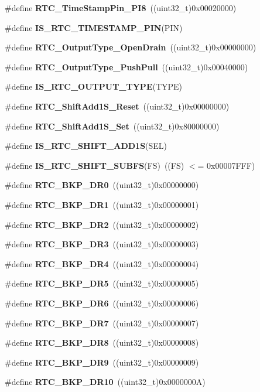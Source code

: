 \begin{DoxyCompactItemize}
\#define \textbf{ R\+T\+C\+\_\+\+Time\+Stamp\+Pin\+\_\+\+P\+I8}~((uint32\+\_\+t)0x00020000)
\item 
\#define \textbf{ I\+S\+\_\+\+R\+T\+C\+\_\+\+T\+I\+M\+E\+S\+T\+A\+M\+P\+\_\+\+P\+IN}(P\+IN)
\item 
\#define \textbf{ R\+T\+C\+\_\+\+Output\+Type\+\_\+\+Open\+Drain}~((uint32\+\_\+t)0x00000000)
\item 
\#define \textbf{ R\+T\+C\+\_\+\+Output\+Type\+\_\+\+Push\+Pull}~((uint32\+\_\+t)0x00040000)
\item 
\#define \textbf{ I\+S\+\_\+\+R\+T\+C\+\_\+\+O\+U\+T\+P\+U\+T\+\_\+\+T\+Y\+PE}(T\+Y\+PE)
\item 
\#define \textbf{ R\+T\+C\+\_\+\+Shift\+Add1\+S\+\_\+\+Reset}~((uint32\+\_\+t)0x00000000)
\item 
\#define \textbf{ R\+T\+C\+\_\+\+Shift\+Add1\+S\+\_\+\+Set}~((uint32\+\_\+t)0x80000000)
\item 
\#define \textbf{ I\+S\+\_\+\+R\+T\+C\+\_\+\+S\+H\+I\+F\+T\+\_\+\+A\+D\+D1S}(S\+EL)
\item 
\#define \textbf{ I\+S\+\_\+\+R\+T\+C\+\_\+\+S\+H\+I\+F\+T\+\_\+\+S\+U\+B\+FS}(FS)~((FS) $<$= 0x00007\+F\+F\+F)
\item 
\#define \textbf{ R\+T\+C\+\_\+\+B\+K\+P\+\_\+\+D\+R0}~((uint32\+\_\+t)0x00000000)
\item 
\#define \textbf{ R\+T\+C\+\_\+\+B\+K\+P\+\_\+\+D\+R1}~((uint32\+\_\+t)0x00000001)
\item 
\#define \textbf{ R\+T\+C\+\_\+\+B\+K\+P\+\_\+\+D\+R2}~((uint32\+\_\+t)0x00000002)
\item 
\#define \textbf{ R\+T\+C\+\_\+\+B\+K\+P\+\_\+\+D\+R3}~((uint32\+\_\+t)0x00000003)
\item 
\#define \textbf{ R\+T\+C\+\_\+\+B\+K\+P\+\_\+\+D\+R4}~((uint32\+\_\+t)0x00000004)
\item 
\#define \textbf{ R\+T\+C\+\_\+\+B\+K\+P\+\_\+\+D\+R5}~((uint32\+\_\+t)0x00000005)
\item 
\#define \textbf{ R\+T\+C\+\_\+\+B\+K\+P\+\_\+\+D\+R6}~((uint32\+\_\+t)0x00000006)
\item 
\#define \textbf{ R\+T\+C\+\_\+\+B\+K\+P\+\_\+\+D\+R7}~((uint32\+\_\+t)0x00000007)
\item 
\#define \textbf{ R\+T\+C\+\_\+\+B\+K\+P\+\_\+\+D\+R8}~((uint32\+\_\+t)0x00000008)
\item 
\#define \textbf{ R\+T\+C\+\_\+\+B\+K\+P\+\_\+\+D\+R9}~((uint32\+\_\+t)0x00000009)
\item 
\#define \textbf{ R\+T\+C\+\_\+\+B\+K\+P\+\_\+\+D\+R10}~((uint32\+\_\+t)0x0000000\+A)

\end{DoxyCompactItemize}
